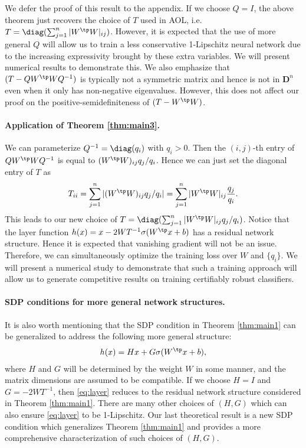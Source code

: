 \documentclass{article} \usepackage{iclr2023_conference,times}
\newcommand{\D}{\mathbf{D}}
\newcommand{\0}{\mathbf{0} }
\begin{document}
We defer the proof of this result to the appendix. If we choose $Q=I$, the above theorem just recovers the choice of $T$ used in AOL, i.e. $T=\diag(\sum_{j=1}^n |W^\tp W|_{ij})$. However, it is expected that the use of more general $Q$ will allow us to train a less conservative 1-Lipschitz neural network due to the increasing expressivity brought by these extra variables. We will present numerical results to demonstrate this. We also emphasize that $(T-QW^\tp W Q^{-1})$ is typically not a symmetric matrix and hence is not in $\D^n$ even when it only has non-negative eigenvalues. However, this does not affect our proof on the positive-semidefiniteness of $(T-W^\tp W)$. 

\paragraph{Application of Theorem \ref{thm:main3}.} We can parameterize $Q^{-1}=\diag(q_i)$ with $q_i>0$. Then the $(i,j)$-th entry of $QW^\tp W Q^{-1}$ is equal to $(W^\tp W)_{ij} q_j/q_i$.
Hence we can just set the diagonal entry of $T$ as \begin{align}\label{eq:SLLT}
T_{ii}=\sum_{j=1}^n |(W^\tp W)_{ij}q_j/q_i|=\sum_{j=1}^n |W^\tp W|_{ij} \frac{q_j}{q_i}.
\end{align}
This leads to our new choice of $T=\diag(\sum_{j=1}^n |W^\tp W|_{ij}q_j/q_i)$.
Notice that the layer function $h(x)=x-2WT^{-1}\sigma(W^\tp x+b)$ has a residual network structure. Hence it is expected that vanishing gradient will not be an issue. Therefore, we can simultaneously optimize the training loss over $W$ and $\{q_i\}$. We will present a numerical study to demonstrate that such a training approach will allow us to generate competitive results on training certifiably robust classifiers.  


\paragraph{SDP conditions for more general network structures.} It is also worth mentioning that the SDP condition in Theorem \ref{thm:main1} can be generalized to address the following more general structure:
\begin{align}\label{eq:layer}
h(x)=H x+ G \sigma(W^\tp x+b),
\end{align}
where $H$ and $G$ will be determined by the weight $W$ in some manner, and the matrix dimensions are assumed to be compatible. If we choose $H=I$ and $G=-2WT^{-1}$, then \eqref{eq:layer} reduces to the residual network structure considered in Theorem \ref{thm:main1}. There are many other choices of $(H,G)$ which can also ensure \eqref{eq:layer} to be 1-Lipschitz. Our last theoretical result is a new SDP condition which generalizes Theorem \ref{thm:main1} and provides a more comprehensive characterization of such choices of $(H,G)$. 
\end{document}
